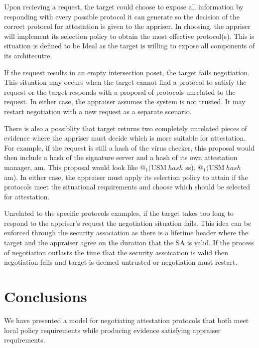 \documentclass[sigconf,authordraft]{acmart}
\begin{document}
Upon recieving a request, the target could choose to expose all
information by responding with every possible protocol it can generate
so the decision of the correct protocol for attestation is given to
the appriser. In choosing, the appriser will implement its selection
policy to obtain the most effective protocol(s). This is situation is
defined to be \gls{Ideal} as the target is willing to expose all
components of its architecutre.

If the request results in an empty intersection poset, the target
fails negotiation. This situation may occurs when the target cannot
find a protocol to satisfy the request or the target responds with a
proposal of protocols unrelated to the request. In either case, the
appraiser assumes the system is not trusted. It may restart
negotiation with a new request as a separate scenario.

There is also a possiblity that target returns two completely
unrelated pieces of evidence where the appriser must decide which is
more suitable for attestation. For example, if the request is still a
hash of the virus checker, this proposal would then include a hash of
the signature server and a hash of its own attestation manager,
am. This proposal would look like {$@_1 (\text{USM}\: hash$ ss),
  $@_1 (\text{USM}\: hash$ am)}. In either case, the appraiser must
apply its selection policy to attain if the protocols meet the
situational requirements and choose which should be selected for
attestation.


Unrelated to the specific protocols examples, if the target takes too
long to respond to the appriser's request the negotiation situation
fails. This idea can be enforced through the security association as
there is a lifetime header where the target and the appraiser agree on
the duration that the SA is valid. If the process of negotiation
outlasts the time that the security assoication is valid then
negotiation fails and target is deemed untrusted or negotiation must
restart.

\printglossary \glsaddallunused

\section{Conclusions}

We have presented a model for negotiating attestation protocols that
both meet local policy requirements while producing evidence
satisfying appraiser requirements.

\nocite{Coker::Principles-of-R,Ramsdell:2019aa,Petz:2019aa,Davey:02:Introduction-to}

 
\end{document}
